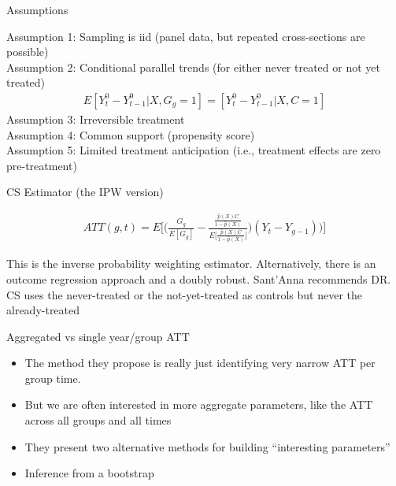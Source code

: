 \documentclass{beamer}
\begin{document}
\begin{frame}{Assumptions}

Assumption 1: Sampling is iid (panel data, but repeated cross-sections are possible) \\
\bigskip
Assumption 2: Conditional parallel trends (for either never treated or not yet treated) \\
\begin{eqnarray*}
E[Y_t^0 - Y_{t-1}^0 | X,G_g=1] = [Y_t^0 - Y_{t-1}^0 | X,C=1] 
\end{eqnarray*}
\bigskip
Assumption 3: Irreversible treatment \\
Assumption 4: Common support (propensity score) \\
\bigskip
Assumption 5: Limited treatment anticipation (i.e., treatment effects are zero pre-treatment)

\end{frame}

\begin{frame}{CS Estimator (the IPW version)}

\begin{eqnarray*}
ATT(g,t) = E \bigg [ \bigg ( \frac{G_g}{E[G_g]} - \frac{ \frac{\hat{p}(X)C}{1-\hat{p}(X)}}{E \bigg [ \frac{\hat{p}(X)C}{1-\hat{p}(X)} \bigg ]} \bigg ) (Y_t - Y_{g-1} ) \bigg ) \bigg ]
\end{eqnarray*}

This is the inverse probability weighting estimator.  Alternatively, there is an outcome regression approach and a doubly robust. Sant'Anna recommends DR.  CS uses the never-treated or the not-yet-treated as controls but never the already-treated 
\end{frame}




\begin{frame}{Aggregated vs single year/group ATT}

\begin{itemize}
\item The method they propose is really just identifying very narrow ATT per group time.
\item But we are often interested in  more aggregate parameters, like the ATT across all groups and all times
\item They present two alternative methods for building ``interesting parameters'' 
\item Inference from a bootstrap
\end{itemize}


\end{frame}
\end{document}
